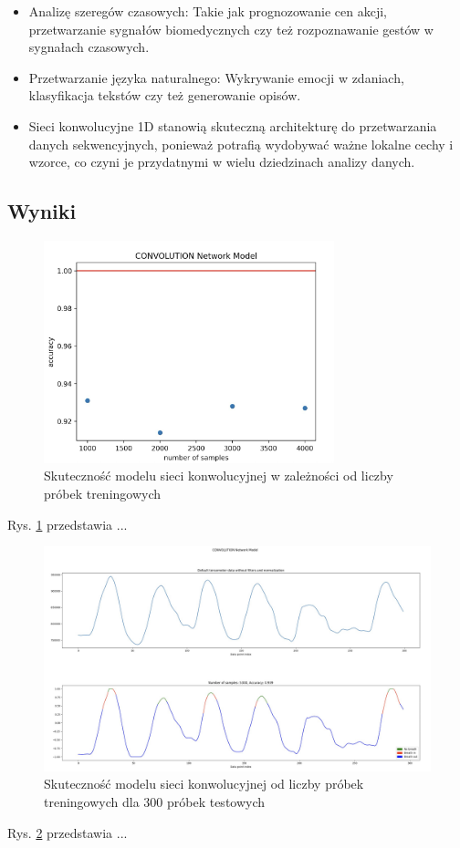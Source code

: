 \documentclass{article}
\begin{document}
\begin{itemize}

\item Analizę szeregów czasowych: Takie jak prognozowanie cen akcji, przetwarzanie sygnałów biomedycznych czy też rozpoznawanie gestów w sygnałach czasowych.
\item Przetwarzanie języka naturalnego: Wykrywanie emocji w zdaniach, klasyfikacja tekstów czy też generowanie opisów.
\item Sieci konwolucyjne 1D stanowią skuteczną architekturę do przetwarzania danych sekwencyjnych, ponieważ potrafią wydobywać ważne lokalne cechy i wzorce, co czyni je przydatnymi w wielu dziedzinach analizy danych.

\end{itemize}

\subsection{Wyniki}

\begin{figure}[H]
    \centering
    \includegraphics[width=0.75\textwidth]{rek/dokladnosc.png}
    \caption{Skuteczność modelu sieci konwolucyjnej w zależności od liczby próbek treningowych}
    \label{fig:data_chart12}
\end{figure}

Rys. \ref{fig:data_chart12} przedstawia ...

\begin{figure}[H]
    \centering
    \includegraphics[width=\textwidth]{rek/skutecznosc.png}
    \caption{Skuteczność modelu sieci konwolucyjnej od liczby próbek treningowych dla 300 próbek testowych}
    \label{fig:data_chart13}
\end{figure}

Rys. \ref{fig:data_chart13} przedstawia ...
\end{document}
